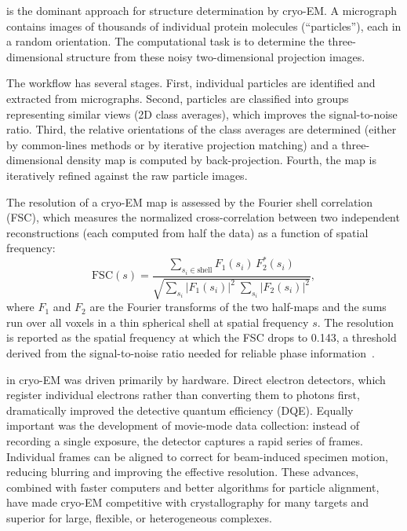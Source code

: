  is the dominant approach for structure determination by cryo-EM.  A micrograph contains images of thousands of individual protein molecules (``particles''), each in a random orientation.  The computational task is to determine the three-dimensional structure from these noisy two-dimensional projection images.

The workflow has several stages.  First, individual particles are identified and extracted from micrographs.  Second, particles are classified into groups representing similar views (2D class averages), which improves the signal-to-noise ratio.  Third, the relative orientations of the class averages are determined (either by common-lines methods or by iterative projection matching) and a three-dimensional density map is computed by back-projection.  Fourth, the map is iteratively refined against the raw particle images.

The resolution of a cryo-EM map is assessed by the Fourier shell correlation (FSC), which measures the normalized cross-correlation between two independent reconstructions (each computed from half the data) as a function of spatial frequency:
\begin{equation}
  \text{FSC}(s) = \frac{\sum_{s_i \in \text{shell}} F_1(s_i)\, F_2^*(s_i)}
                       {\sqrt{\sum_{s_i} |F_1(s_i)|^2 \;\sum_{s_i} |F_2(s_i)|^2}},
  \label{eq:fsc}
\end{equation}
where $F_1$ and $F_2$ are the Fourier transforms of the two half-maps and the sums run over all voxels in a thin spherical shell at spatial frequency $s$.  The resolution is reported as the spatial frequency at which the FSC drops to 0.143, a threshold derived from the signal-to-noise ratio needed for reliable phase information~\cite{rosenthal2003}.

 in cryo-EM was driven primarily by hardware.  Direct electron detectors, which register individual electrons rather than converting them to photons first, dramatically improved the detective quantum efficiency (DQE).  Equally important was the development of movie-mode data collection: instead of recording a single exposure, the detector captures a rapid series of frames.  Individual frames can be aligned to correct for beam-induced specimen motion, reducing blurring and improving the effective resolution.  These advances, combined with faster computers and better algorithms for particle alignment, have made cryo-EM competitive with crystallography for many targets and superior for large, flexible, or heterogeneous complexes.


